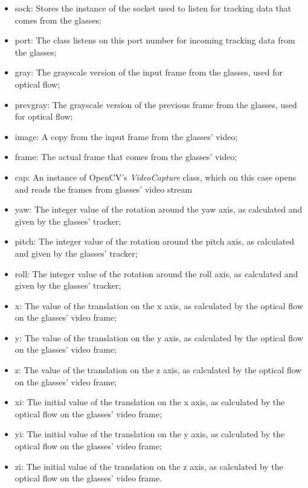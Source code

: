 \documentclass[msc, a4paper, classic, en]{ufbathesis}
\begin{document}
\begin{itemize}
  \item sock: Stores the instance of the socket used to listen for tracking data that comes from the glasses;
  \item port: The class listens on this port number for incoming tracking data from the glasses;
  \item gray: The grayscale version of the input frame from the glasses, used for optical flow;
  \item prevgray: The grayscale version of the previous frame from the glasses, used for optical flow;
  \item image: A copy from the input frame from the glasses' video;
  \item frame: The actual frame that comes from the glasses' video;
  \item cap: An instance of OpenCV's \textit{VideoCapture} class, which on this case opens and reads the frames from glasses' video stream
  \item yaw: The integer value of the rotation around the yaw axis, as calculated and given by the glasses' tracker;
  \item pitch: The integer value of the rotation around the pitch axis, as calculated and given by the glasses' tracker;
  \item roll: The integer value of the rotation around the roll axis, as calculated and given by the glasses' tracker;
  \item x: The value of the translation on the x axis, as calculated by the optical flow on the glasses' video frame;
  \item y: The value of the translation on the y axis, as calculated by the optical flow on the glasses' video frame;
  \item z: The value of the translation on the z axis, as calculated by the optical flow on the glasses' video frame;
  \item xi: The initial value of the translation on the x axis, as calculated by the optical flow on the glasses' video frame;
  \item yi: The initial value of the translation on the y axis, as calculated by the optical flow on the glasses' video frame;
  \item zi: The initial value of the translation on the z axis, as calculated by the optical flow on the glasses' video frame.
\end{itemize}
\end{document}
